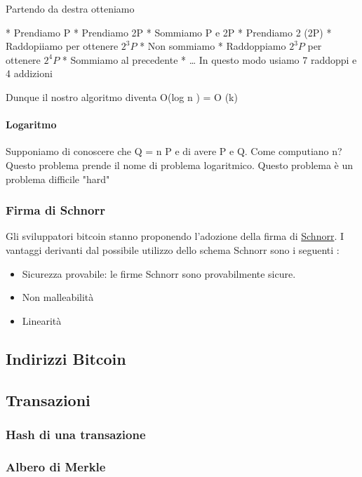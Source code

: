\documentclass{book}
\theoremstyle{definition}
\begin{document}

Partendo da destra otteniamo

* Prendiamo P
* Prendiamo 2P
* Sommiamo P e 2P
* Prendiamo 2 (2P)
* Raddopiiamo per ottenere $2^{3}P$
* Non sommiamo
* Raddoppiamo $2^{3}P$ per ottenere $2^{4}P$
* Sommiamo al precedente
* \dots
In questo modo usiamo 7 raddoppi e 4 addizioni

Dunque il nostro algoritmo diventa O(log n ) = O (k)

\paragraph{Logaritmo}

Supponiamo di conoscere che Q = n P e di avere P e Q. Come computiano n?
Questo problema prende il nome di problema logaritmico.
Questo problema è un problema difficile "hard"

\subsubsection{Firma di Schnorr} \label{Schnorr}

Gli sviluppatori bitcoin stanno proponendo l'adozione della firma di \href{https://en.bitcoin.it/wiki/Schnorr}{Schnorr}.
I vantaggi derivanti dal possibile utilizzo dello schema Schnorr sono i seguenti \cite{BipSchnorr}:

\begin{itemize}
    \item Sicurezza provabile: le firme Schnorr sono provabilmente sicure.
    \item Non malleabilità
    \item Linearità
\end{itemize}

\newpage
\subsection{Indirizzi Bitcoin}

\newpage
\subsection{Transazioni}
\subsubsection{Hash di una transazione}
\subsubsection{Albero di Merkle}
\end{document}

